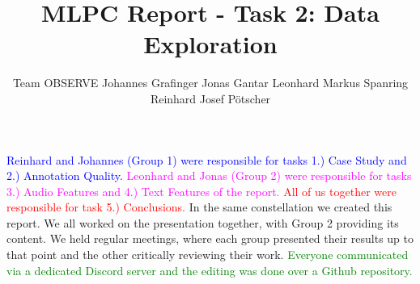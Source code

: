 \documentclass{article}
\title{MLPC Report  - Task 2: Data Exploration}
\author{
  Team OBSERVE \AND
  Johannes Grafinger 
  \And
  Jonas Gantar 
  \And 
  Leonhard Markus Spanring 
  \And 
  Reinhard Josef Pötscher
}
\begin{document}
\maketitle

\begin{contributions}
  \textcolor{blue}{Reinhard and Johannes (Group 1) were responsible for tasks 1.) Case Study and 2.) Annotation Quality.} 
  \textcolor{magenta}{Leonhard and Jonas (Group 2) were responsible for tasks 3.) Audio Features and 4.) Text Features of the report.} 
  \textcolor{red}{All of us together were responsible for task 5.) Conclusions.} 
  In the same constellation we created this report. We all worked on the presentation together, with Group 2 providing its content. We held regular meetings, where each group presented their results up to that point and the other critically reviewing their work.
  \textcolor{green}{Everyone communicated via a dedicated Discord server and the editing was done over a Github repository.} 
\end{contributions}










\end{document}
